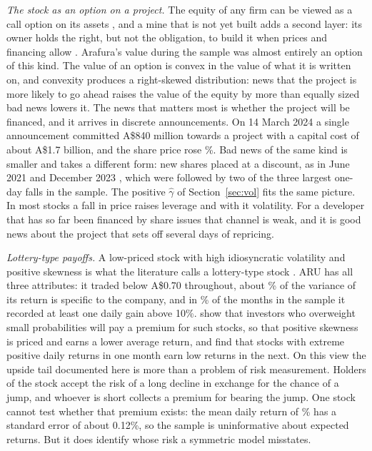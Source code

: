 \documentclass[11pt,a4paper]{article}
\begin{document}
\emph{The stock as an option on a project.} The equity of any firm can be viewed as a call option on its assets \citep{merton1974}, and a mine that is not yet built adds a second layer: its owner holds the right, but not the obligation, to build it when prices and financing allow \citep{brennanschwartz1985,mcdonaldsiegel1986}. Arafura's value during the sample was almost entirely an option of this kind. The value of an option is convex in the value of what it is written on, and convexity produces a right-skewed distribution: news that the project is more likely to go ahead raises the value of the equity by more than equally sized bad news lowers it. The news that matters most is whether the project will be financed, and it arrives in discrete announcements. On 14 March 2024 a single announcement committed A\$840 million towards a project with a capital cost of about A\$1.7 billion, and the share price rose \jumpSimple\%. Bad news of the same kind is smaller and takes a different form: new shares placed at a discount, as in June 2021 and December 2023 \citep{miningweekly2021,miningweekly2023}, which were followed by two of the three largest one-day falls in the sample. The positive $\hat\gamma$ of Section~\ref{sec:vol} fits the same picture. In most stocks a fall in price raises leverage and with it volatility. For a developer that has so far been financed by share issues that channel is weak, and it is good news about the project that sets off several days of repricing.

\emph{Lottery-type payoffs.} A low-priced stock with high idiosyncratic volatility and positive skewness is what the literature calls a lottery-type stock \citep{kumar2009}. ARU has all three attributes: it traded below A\$0.70 throughout, about \capmIdio\% of the variance of its return is specific to the company, and in \lotShare\% of the months in the sample it recorded at least one daily gain above 10\%. \citet{barberishuang2008} show that investors who overweight small probabilities will pay a premium for such stocks, so that positive skewness is priced and earns a lower average return, and \citet{bali2011} find that stocks with extreme positive daily returns in one month earn low returns in the next. On this view the upside tail documented here is more than a problem of risk measurement. Holders of the stock accept the risk of a long decline in exchange for the chance of a jump, and whoever is short collects a premium for bearing the jump. One stock cannot test whether that premium exists: the mean daily return of \aruMean\% has a standard error of about 0.12\%, so the sample is uninformative about expected returns. But it does identify whose risk a symmetric model misstates.
\end{document}
